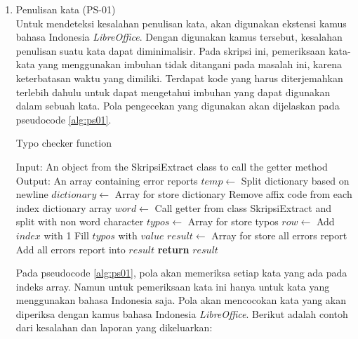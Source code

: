 \begin{enumerate}
	\item Penulisan kata (PS-01) \\
	Untuk mendeteksi kesalahan penulisan kata, akan digunakan ekstensi kamus bahasa Indonesia \textit{LibreOffice}. Dengan digunakan kamus tersebut, kesalahan penulisan suatu kata dapat diminimalisir. Pada skripsi ini, pemeriksaan kata-kata yang menggunakan imbuhan tidak ditangani pada masalah ini, karena keterbatasan waktu yang dimiliki. Terdapat kode yang harus diterjemahkan terlebih dahulu untuk dapat mengetahui imbuhan yang dapat digunakan dalam sebuah kata. Pola pengecekan yang digunakan akan dijelaskan pada pseudocode \ref{alg:ps01}.
		
\begin{minipage}{1.0\linewidth}
\begin{algorithm}[H]
    \caption{Typo checker function}
	\label{alg:ps01}
	\begin{algorithmic}[1]
    		\State Input: An object from the SkripsiExtract class to call the getter method
			\State Output: An array containing error reports		
			\State $temp \gets$ Split dictionary based on newline
			\State $dictionary \gets$ Array for store dictionary
				\State Remove affix code from each index dictionary array 
			\EndFor
			\State $word \gets$ Call getter from class SkripsiExtract and split with non word character
			\State $typos \gets$ Array for store typos
    			\State $row \gets$ Add $index$ with 1
                	\State Fill $typos$ with $value$
            	\EndIf
        	\EndFor
			\State $result \gets$ Array for store all errors report
                \State Add all errors report into $result$
            \EndIf
    		\State \textbf{return} $result$
    	\EndFunction
	\end{algorithmic}
\end{algorithm}
\end{minipage}
\medskip

	Pada pseudocode \ref{alg:ps01}, pola akan memeriksa setiap kata yang ada pada indeks array. Namun untuk pemeriksaan kata ini hanya untuk kata yang menggunakan bahasa Indonesia saja. Pola akan mencocokan kata yang akan diperiksa dengan kamus bahasa Indonesia \textit{LibreOffice}. Berikut adalah contoh dari kesalahan dan laporan yang dikeluarkan:
	

\end{enumerate}
